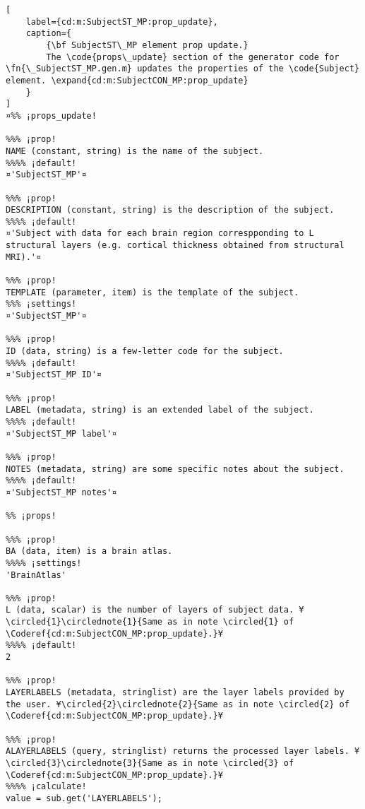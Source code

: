\documentclass{tufte-handout}
\begin{document}
\begin{lstlisting}[
	label={cd:m:SubjectST_MP:prop_update},
	caption={
		{\bf SubjectST\_MP element prop update.}
		The \code{props\_update} section of the generator code for \fn{\_SubjectST_MP.gen.m} updates the properties of the \code{Subject} element. \expand{cd:m:SubjectCON_MP:prop_update}
	}
]
¤%% ¡props_update!

%%% ¡prop!
NAME (constant, string) is the name of the subject.
%%%% ¡default!
¤'SubjectST_MP'¤

%%% ¡prop!
DESCRIPTION (constant, string) is the description of the subject.
%%%% ¡default!
¤'Subject with data for each brain region correspponding to L structural layers (e.g. cortical thickness obtained from structural MRI).'¤

%%% ¡prop!
TEMPLATE (parameter, item) is the template of the subject.
%%% ¡settings!
¤'SubjectST_MP'¤

%%% ¡prop!
ID (data, string) is a few-letter code for the subject.
%%%% ¡default!
¤'SubjectST_MP ID'¤

%%% ¡prop!
LABEL (metadata, string) is an extended label of the subject.
%%%% ¡default!
¤'SubjectST_MP label'¤

%%% ¡prop!
NOTES (metadata, string) are some specific notes about the subject.
%%%% ¡default!
¤'SubjectST_MP notes'¤

%% ¡props!

%%% ¡prop!
BA (data, item) is a brain atlas.
%%%% ¡settings!
'BrainAtlas'

%%% ¡prop!
L (data, scalar) is the number of layers of subject data. ¥\circled{1}\circlednote{1}{Same as in note \circled{1} of \Coderef{cd:m:SubjectCON_MP:prop_update}.}¥
%%%% ¡default!
2

%%% ¡prop!
LAYERLABELS (metadata, stringlist) are the layer labels provided by the user. ¥\circled{2}\circlednote{2}{Same as in note \circled{2} of \Coderef{cd:m:SubjectCON_MP:prop_update}.}¥

%%% ¡prop!
ALAYERLABELS (query, stringlist) returns the processed layer labels. ¥\circled{3}\circlednote{3}{Same as in note \circled{3} of \Coderef{cd:m:SubjectCON_MP:prop_update}.}¥
%%%% ¡calculate!
value = sub.get('LAYERLABELS');


\end{lstlisting}
\end{document}
